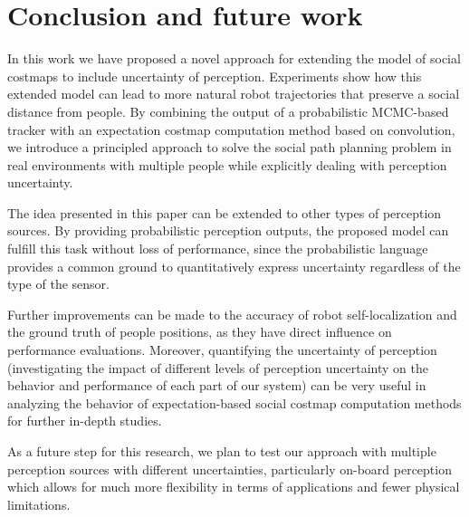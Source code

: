 \section{Conclusion and future work}
\label{sec:conclusion}

In this work we have proposed a novel approach for extending the model of social costmaps to include uncertainty of perception. Experiments show how this extended model can lead to more natural robot trajectories that preserve a social distance from people. By combining the output of a probabilistic MCMC-based tracker with an expectation costmap computation method based on convolution, we introduce a principled approach to solve the social path planning problem in real environments with multiple people while explicitly dealing with perception uncertainty. 



The idea presented in this paper can be extended to other types of perception sources. By providing probabilistic perception outputs, the proposed model can fulfill this task without loss of performance, since the probabilistic language provides a common ground to quantitatively express uncertainty regardless of the type of the sensor. 


Further improvements can be made to the accuracy of robot self-localization and the ground truth of people positions, as they have direct influence on performance evaluations. Moreover, quantifying the uncertainty of perception (investigating the impact of different levels of perception uncertainty on the behavior and performance of each part of our system) can be very useful in analyzing the behavior of expectation-based social costmap computation methods for further in-depth studies.


As a future step for this research, we plan to test our approach with multiple perception sources with different uncertainties, particularly on-board perception which allows for much more flexibility in terms of applications and fewer physical limitations.%









